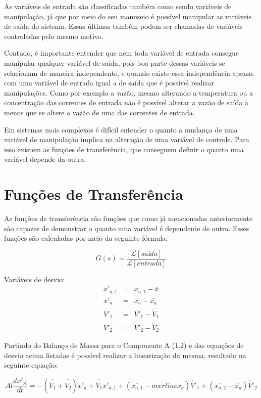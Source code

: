 \documentclass[
	12pt,				%
	openright,			%
	oneside,			%
	a4paper,			%
	english,			%
	french,				%
	spanish,			%
	brazil				%
	]{abntex2}
\begin{document}
As variáveis de entrada são classificadas também como sendo variáveis de manipulação, já que por meio do seu manuseio é possível manipular as variáveis de saída do sistema. Essas últimas também podem ser chamadas de variáveis controladas pelo mesmo motivo. 

Contudo, é importante entender que nem toda variável de entrada consegue manipular qualquer variável de saída, pois boa parte dessas variáveis se relacionam de maneira independente, e quando existe essa independência apenas com uma variável de entrada igual a de saída que é possível realizar manipulações. Como por exemplo a vazão, mesmo alterando a temperatura ou a concentração das correntes de entrada não é possível alterar a vazão de saída a menos que se altere a vazão de uma das correntes de entrada.

Em sistemas mais complexos é difícil entender o quanto a mudança de uma variável de manipulação implica na alteração de uma variável de controle. Para isso existem as funções de transferência, que conseguem definir o quanto uma variável depende da outra.

\newpage
\chapter{Funções de Transferência}
\pagestyle{fancy}

As funções de transferência são funções que como já mencionadas anteriormente são capazes de demonstrar o quanto uma variável é dependente de outra. Esses funções são calculadas por meio da seguinte fórmula:

\begin{equation}
G(s) = \frac{\mathcal{L}[saída]}{\mathcal{L}[entrada]}
\end{equation}

Variáveis de desvio:
\begin{eqnarray}
x'_{a,1} &=& x_{a,1} - \overline{x}\\
x'_{a} &=& x_{a} - \overline{x_{a}}\\
\dot{V'}_{1} &=& \dot{V'}_{1} - \overline{\dot{V}_{1}}\\
\dot{V'}_{2} &=& \dot{V'}_{2} - \overline{\dot{V}_{2}}
\end{eqnarray}

Partindo do Balanço de Massa para o Componente A (1.2) e das equações de desvio acima listadas é possível realizar a linearização da mesma, resultado na seguinte equação:

\begin{equation}
Al\frac{dx'_{A}}{dt} = -(\overline{\dot{V}_{1}}+\overline{\dot{V}_{2}})x'_{a} + \overline{\dot{V}_{1}}x'_{a,1} + (\overline{x_{a,1}}-overline{x_{a}})\dot{V'}_{1} + (\overline{x_{a,2}}-\overline{x_{a}})\dot{V'}_{2}
\end{equation}
\end{document}
